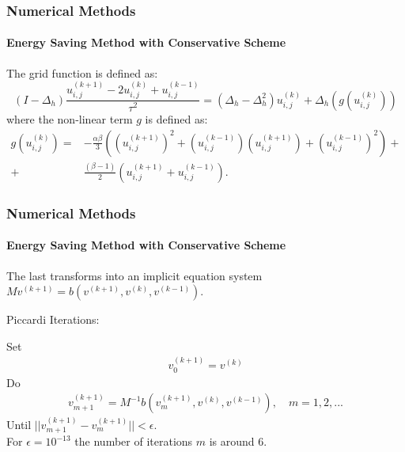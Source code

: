 \documentclass{beamer}
\begin{document}

\begin{frame}
\frametitle{Numerical Methods}
\framesubtitle{Energy Saving Method with Conservative Scheme}
The grid function is defined as:
\begin{equation}
(I-\Delta_h)\frac{ u^{(k+1)}_{i, j} - 2u^{(k)}_{i,j} + u^{(k-1)}_{i,j} }{\tau^2} = (\Delta_h - \Delta_h^2)u^{(k)}_{i,j} + \Delta_h(g(u^{(k)}_{i,j}))
\end{equation}
%
where the non-linear term $g$ is defined as:
\begin{align}
g(u^{(k)}_{i,j})=& -\frac{\alpha \beta} { 3 } \left( (u^{(k+1)}_{i,j})^2 + (u^{(k-1)}_{i,j})(u^{(k+1)}_{i,j}) + (u^{(k-1)}_{i,j})^2 \right) + \nonumber\\
+&\frac{ (\beta - 1 )}{ 2 }\left( u^{(k+1)}_{i,j} + u^{(k-1)}_{i,j} \right).
\end{align}


\end{frame}


\begin{frame}
\frametitle{Numerical Methods}
\framesubtitle{Energy Saving Method with Conservative Scheme}
The last transforms into an implicit equation system $M v^{(k+1)} = b( v^{(k+1)} ,  v^{(k)} ,  v^{(k-1)}  )$.

Piccardi  Iterations:

Set
\begin{align}
 v^{(k+1)}_0 =  v^{(k)}
\end{align}
Do
\begin{align}
 v^{(k+1)}_{m+1} =  M^{-1}  b( v^{(k+1)}_{m} ,  v^{(k)} , v^{(k-1)}  ), \quad m=1,2, ...
\end{align}
Until $||  v^{(k+1)}_{m+1} -  v^{(k+1)}_{m}|| < \epsilon$. 
\\
For $\epsilon = 10^{-13}$ the number of iterations $m$ is around 6.
\end{frame}

\end{document}
